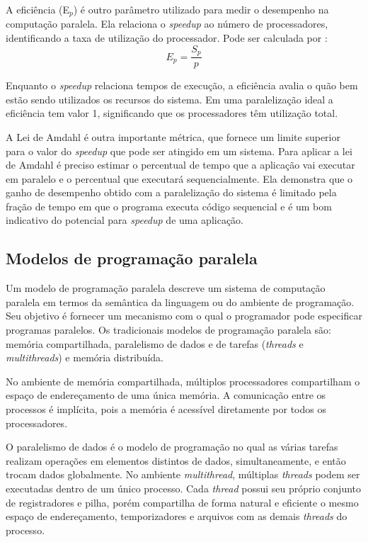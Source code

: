 A eficiência (E$_p$) é outro parâmetro utilizado para medir o desempenho na computação paralela.  Ela relaciona o \textit{speedup} ao número de processadores, identificando a taxa de utilização do processador. Pode ser calculada por \cite{Rauber:2010}: 
 \[ E_p = \frac{S_p}{p} \]
 
Enquanto o \textit{speedup} relaciona tempos de execução, a eficiência avalia o quão bem estão sendo utilizados os recursos do sistema. Em uma paralelização ideal a eficiência tem valor 1, significando que os processadores têm utilização total.
		
A Lei de Amdahl é outra importante métrica, que fornece um limite superior para o valor do \textit{speedup} que pode ser atingido em um sistema. Para aplicar a lei de Amdahl é preciso estimar o percentual de tempo que a aplicação vai executar em paralelo e   o percentual que executará sequencialmente. 
Ela demonstra que o ganho de desempenho obtido com a paralelização do sistema é limitado pela fração de tempo em que o programa executa código sequencial e é um bom indicativo do potencial para \textit{speedup} de uma aplicação.


\subsection{Modelos de programação paralela}

Um modelo de programação paralela descreve um sistema de computação paralela em termos da semântica da linguagem ou do ambiente de programação. Seu objetivo é fornecer um mecanismo com o qual o programador pode especificar programas paralelos. Os tradicionais modelos de programação paralela são: memória compartilhada, paralelismo de dados e de tarefas (\textit{threads} e \textit{multithreads}) e memória distribuída.

No ambiente de memória compartilhada, múltiplos processadores compartilham o espaço de endereçamento de uma única memória. A comunicação entre os processos é implícita, pois a memória é acessível diretamente por todos os processadores. 

O paralelismo de dados é o modelo de programação no qual as várias tarefas realizam operações em elementos distintos de dados, simultaneamente, e então trocam dados globalmente. No ambiente \textit{multithread}, múltiplas \textit{threads} podem ser executadas dentro de um único processo. Cada \textit{thread} possui seu próprio conjunto de registradores e pilha, porém compartilha de forma natural e eficiente o mesmo espaço de endereçamento, temporizadores e arquivos com as demais \textit{threads} do processo. 

